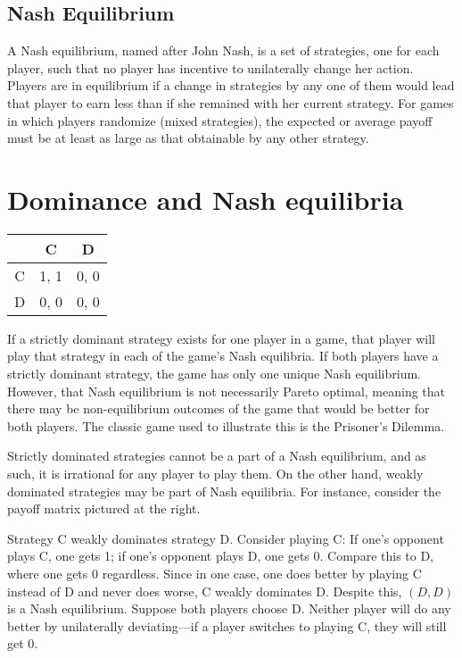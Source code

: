 \documentclass[]{report}
\begin{document}
\subsection{Nash Equilibrium}
A Nash equilibrium, named after John Nash, is a set of strategies, one for each player, such that no player has incentive to unilaterally change her action. Players are in equilibrium if a change in strategies by any one of them would lead that player to earn less than if she remained with her current strategy. For games in which players randomize (mixed strategies), the expected or average payoff must be at least as large as that obtainable by any other strategy.

\section{Dominance and Nash equilibria}
\begin{tabular}{|c|c|c|} \hline
      &  C   &	D  \\ \hline
C     &	1, 1 & 	0, 0 \\ \hline
D     &	0, 0 &	0, 0 \\ \hline
\end{tabular}
If a strictly dominant strategy exists for one player in a game, that player will play that strategy in each of the game's Nash equilibria. If both players have a strictly dominant strategy, the game has only one unique Nash equilibrium. However, that Nash equilibrium is not necessarily Pareto optimal, meaning that there may be non-equilibrium outcomes of the game that would be better for both players. The classic game used to illustrate this is the Prisoner's Dilemma.

Strictly dominated strategies cannot be a part of a Nash equilibrium, and as such, it is irrational for any player to play them. On the other hand, weakly dominated strategies may be part of Nash equilibria. For instance, consider the payoff matrix pictured at the right.

Strategy C weakly dominates strategy D. Consider playing C: If one's opponent plays C, one gets 1; if one's opponent plays D, one gets 0. Compare this to D, where one gets 0 regardless. Since in one case, one does better by playing C instead of D and never does worse, C weakly dominates D. Despite this, ${\displaystyle (D,D)}$ is a Nash equilibrium. Suppose both players choose D. Neither player will do any better by unilaterally deviating—if a player switches to playing C, they will still get 0. 
\end{document}

